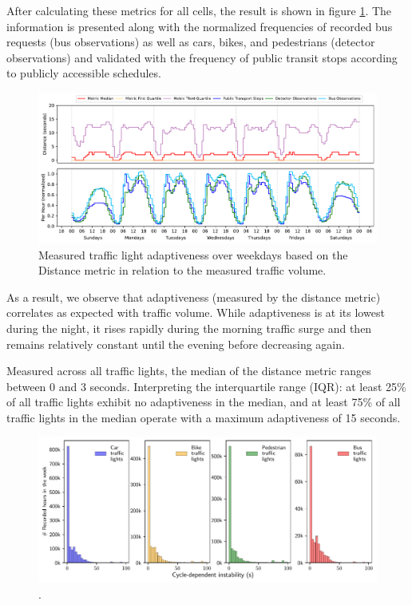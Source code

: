 After calculating these metrics for all cells, the result is shown in figure \ref{fig:adaptiveness-weekdays-distance}. The information is presented along with the normalized frequencies of recorded bus requests (bus observations) as well as cars, bikes, and pedestrians (detector observations) and validated with the frequency of public transit stops according to publicly accessible schedules.

\begin{figure}[t]
    \centering
    \includegraphics[width=\linewidth]{images/adaptiveness-weekdays-distance.pdf}
    \caption{Measured traffic light adaptiveness over weekdays based on the Distance metric in relation to the measured traffic volume.}\label{fig:adaptiveness-weekdays-distance}
\end{figure}

As a result, we observe that adaptiveness (measured by the distance metric) correlates as expected with traffic volume. While adaptiveness is at its lowest during the night, it rises rapidly during the morning traffic surge and then remains relatively constant until the evening before decreasing again.

Measured across all traffic lights, the median of the distance metric ranges between 0 and 3 seconds. Interpreting the interquartile range (IQR): at least 25\% of all traffic lights exhibit no adaptiveness in the median, and at least 75\% of all traffic lights in the median operate with a maximum adaptiveness of 15 seconds.

\begin{figure}[t]
    \centering
    \includegraphics[width=\linewidth]{images/predictability-by-lanes.pdf}
    \caption{.}\label{fig:}
\end{figure}


